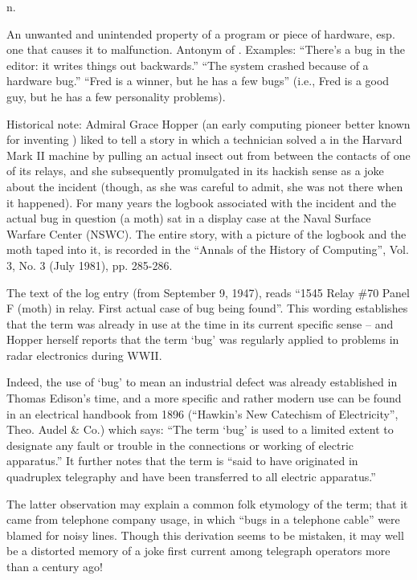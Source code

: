  n.

An unwanted and unintended property of a program or piece of hardware, esp. one
that causes it to malfunction. Antonym of . Examples:
``There's a bug in the editor: it writes things out backwards.'' ``The system
crashed because of a hardware bug.'' ``Fred is a winner, but he has a few bugs''
(i.e., Fred is a good guy, but he has a few personality problems).

Historical note: Admiral Grace Hopper (an early computing pioneer better known
for inventing ) liked to tell a story in which a technician
solved a  in the Harvard Mark II machine by pulling an actual
insect out from between the contacts of one of its relays, and she subsequently
promulgated  in its hackish sense as a joke about the incident
(though, as she was careful to admit, she was not there when it happened). For
many years the logbook associated with the incident and the actual bug in
question (a moth) sat in a display case at the Naval Surface Warfare Center
(NSWC). The entire story, with a picture of the logbook and the moth taped into
it, is recorded in the ``Annals of the History of Computing'', Vol. 3, No. 3
(July 1981), pp. 285-286.

The text of the log entry (from September 9, 1947), reads ``1545 Relay \#70
Panel F (moth) in relay. First actual case of bug being found''. This wording
establishes that the term was already in use at the time in its current specific
sense -- and Hopper herself reports that the term `bug' was regularly applied to
problems in radar electronics during WWII.

Indeed, the use of `bug' to mean an industrial defect was already established in
Thomas Edison's time, and a more specific and rather modern use can be found in
an electrical handbook from 1896 (``Hawkin's New Catechism of Electricity'',
Theo. Audel \& Co.) which says: ``The term `bug' is used to a limited extent to
designate any fault or trouble in the connections or working of electric
apparatus.'' It further notes that the term is ``said to have originated in
quadruplex telegraphy and have been transferred to all electric apparatus.''

The latter observation may explain a common folk etymology of the term; that it
came from telephone company usage, in which ``bugs in a telephone cable'' were
blamed for noisy lines. Though this derivation seems to be mistaken, it may well
be a distorted memory of a joke first current among telegraph operators more
than a century ago!

